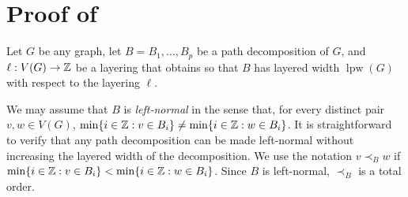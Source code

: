 \documentclass{patmorin}
\DeclareMathOperator{\lpw}{lpw}
\begin{document}
%
%


\section{Proof of }

Let $G$ be any graph, let $B=B_1,\ldots,B_p$ be a path decomposition of $G$, and $\ell:V(G)\to\mathbb{Z}$ be a layering that obtains so that $B$ has layered width $\lpw(G)$ with respect to the layering $\ell$.

We may assume that $B$ is \emph{left-normal} in the sense that, for every distinct pair $v,w\in V(G)$, $\min\{i\in\mathbb{Z} : v\in B_i\} \neq \min\{i\in\mathbb{Z}:w\in B_i\}$. It is straightforward to verify that any path decomposition can be made left-normal without increasing the layered width of the decomposition.
We use the notation $v\prec_B w$ if $\min\{i\in\mathbb{Z} : v\in B_i\} < \min\{i\in\mathbb{Z}:w\in B_i\}$.  Since $B$ is left-normal, $\prec_B$ is a total order.
\end{document}
